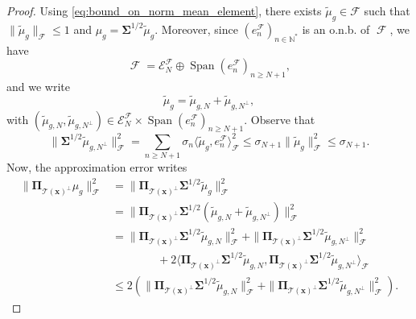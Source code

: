 \documentclass[twoside,11pt]{book}
\numberwithin{theorem}{chapter}
\numberwithin{definition}{chapter}
\numberwithin{proposition}{chapter}
\numberwithin{corollary}{chapter}
\numberwithin{example}{chapter}
\numberwithin{lemma}{chapter}
\numberwithin{assumption}{chapter}
\numberwithin{equation}{chapter}
\numberwithin{figure}{chapter}
\DeclareMathOperator{\Span}{\mathrm{Span}}
\DeclareMathOperator{\F}{\mathcal{F}}
\begin{document}
\begin{proof}
Using \eqref{eq:bound_on_norm_mean_element}, there exists $\tilde{\mu}_{g} \in \mathcal{F}$ such that $\|\tilde{\mu}_{g}\|_{\mathcal{F}} \leq 1$ and $\mu_{g} = \bm{\Sigma}^{1/2}\tilde{\mu}_{g}$. Moreover,
since $(e_{n}^{\F})_{n \in \mathbb{N}^{*}}$ is an o.n.b. of $\F$, we have
\begin{equation}
\F = \mathcal{E}_{N}^{\F} \oplus \Span (e_{n}^{\F})_{n \geq N+1},
\end{equation}
and we write
\begin{equation}
\tilde{\mu}_{g} = \tilde{\mu}_{g,N} + \tilde{\mu}_{g,N^{\perp}},
\end{equation}
with $(\tilde{\mu}_{g,N}, \tilde{\mu}_{g,N^{\perp}}) \in \mathcal{E}_{N}^{\F} \times \Span (e_{n}^{\F})_{n \geq N+1}$. Observe that
\begin{equation}\label{eq:sup_sigma_N}
  \|\bm{\Sigma}^{1/2} \tilde{\mu}_{g,N^{\perp}}\|_{\mathcal{F}}^{2} = \sum\limits_{n \geq N+1} \sigma_{n} \langle \tilde{\mu}_{g},e_{n}^{\F} \rangle_{\F}^{2}  \leq \sigma_{N+1} \|\tilde{\mu}_{g}\|_{\F}^{2} \leq \sigma_{N+1}.
\end{equation}
 Now, the approximation error writes
\begin{align}
  \|\bm{\Pi}_{\mathcal{T}(\bm{x})^{\perp}}\mu_{g}\|^{2}_{\mathcal{F}}& = \| \bm{\Pi}_{\mathcal{T}(\bm{x})^{\perp}}\bm{\Sigma}^{1/2} \tilde{\mu}_{g}\| _{\mathcal{F}}^{2}\\
  & = \| \bm{\Pi}_{\mathcal{T}(\bm{x})^{\perp}}\bm{\Sigma}^{1/2}(\tilde{\mu}_{g,N} + \tilde{\mu}_{g,N^{\perp}}) \| _{\mathcal{F}}^{2} \nonumber\\
  & = \| \bm{\Pi}_{\mathcal{T}(\bm{x})^{\perp}}\bm{\Sigma}^{1/2} \tilde{\mu}_{g,N}\|_{\mathcal{F}}^{2} + \| \bm{\Pi}_{\mathcal{T}(\bm{x})^{\perp}}\bm{\Sigma}^{1/2} \tilde{\mu}_{g,N^{\perp}}\| _{\mathcal{F}}^{2} \\
  & \qquad\qquad + 2 \langle \bm{\Pi}_{\mathcal{T}(\bm{x})^{\perp}}\bm{\Sigma}^{1/2} \tilde{\mu}_{g,N}, \bm{\Pi}_{\mathcal{T}(\bm{x})^{\perp}}\bm{\Sigma}^{1/2} \tilde{\mu}_{g,N^{\perp}}\rangle_{\mathcal{F}} \nonumber\\
  & \leq 2 \left(\| \bm{\Pi}_{\mathcal{T}(\bm{x})^{\perp}}\bm{\Sigma}^{1/2}\tilde{\mu}_{g,N}\| _{\mathcal{F}}^{2} + \| \bm{\Pi}_{\mathcal{T}(\bm{x})^{\perp}}\bm{\Sigma}^{1/2} \tilde{\mu}_{g,N^{\perp}}\| _{\mathcal{F}}^{2}\right) \nonumber.
\end{align}

\end{proof}
\end{document}
